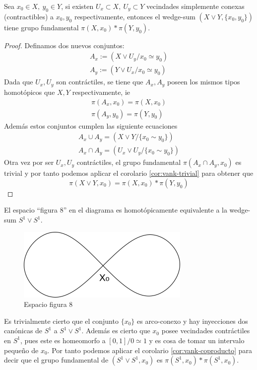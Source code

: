 \begin{corolario}
  \label{cor:vank-coproducto}
  Sea \(x_0 \in X, \ y_0 \in Y\), si existen \(U_x \subset X, \ U_y
  \subset Y\) vecindades simplemente conexas (contractibles) a \(x_0,
  y_0\) respectivamente, entonces el wedge-sum \((X \vee Y , \{x_0 ,
  y_0\})\) tiene grupo fundamental \(\pi (X, x_0) * \pi (Y, y_0)\).
\end{corolario}
\begin{proof}
  Definamos dos nuevos conjuntos:
  \begin{gather*}
    A_x := (X \vee U_y / {x_0 \simeq y_0}) \\
    A_y := (Y \vee U_x / {x_0 \simeq y_0})
  \end{gather*}
  Dada que \(U_x, U_y\) son contráctiles, se tiene que \(A_x, A_y\)
  poseen los mismos tipos homotópicos que \(X, Y\) respectivamente, ie
  \begin{gather*}
    \pi (A_x , x_0) = \pi (X, x_0) \\
    \pi (A_y , y_0) = \pi (Y, y_0)
  \end{gather*}
  Además estos conjuntos cumplen las siguiente ecuaciones
  \begin{gather*}
    A_x \cup A_y = (X \vee Y / \{ x_0 \sim y_0\}) \\
    A_x \cap A_y = (U_x \vee U_y / \{ x_0 \sim y_0\})
  \end{gather*}
  Otra vez por ser \(U_x, U_y\) contráctiles, el grupo fundamental
  \(\pi (A_x \cap A_y, x_0)\) es trivial y por tanto podemos aplicar el
  corolario \ref{cor:vank-trivial} para obtener que
  \[ \pi (X \vee Y, x_0) = \pi (X, x_0) * \pi (Y, y_0) \]
\end{proof}

\begin{ejemplo}
El espacio ``figura 8'' en el diagrama es homotópicamente equivalente a
la wedge-sum \(S^1 \vee S^1\).
  \begin{figure}[h]
    \centering \includegraphics[scale=0.5]{./imagenes/figura8.png}
    \caption*{Espacio figura 8}
  \end{figure}
  Es trivialmente cierto que el conjunto \(\{x_0\}\) es arco-conexo y
  hay inyecciones dos canónicas de \(S^1\) a \(S^1 \vee S^1\). Además es
  cierto que \(x_0\) posee vecindades contráctiles en \(S^1\), pues este
  es homeomorfo a \([0,1]/0 \simeq 1\) y es cosa de tomar un intervalo
  pequeño de \(x_0\). Por tanto podemos aplicar el corolario
  \ref{cor:vank-coproducto} para decir que el grupo fundamental de
  \(\left( S^1 \vee S^1 , x_0 \right) \) es \(\pi \left( S^1 , x_0 \right)
  * \pi \left( S^1 , x_0 \right) \).
\end{ejemplo}

